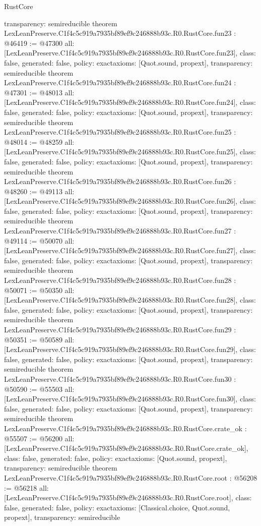 \begin{lexlean}{RustCore}
\begin{coremodule}
{  transparency: semireducible
}
theorem LexLeanPreserve.C1f4c5c919a7935bf89ef9c246888b93c.R0.RustCore.fun23 : @46419 := @47300 {
  all: [LexLeanPreserve.C1f4c5c919a7935bf89ef9c246888b93c.R0.RustCore.fun23],
  class: false,
  generated: false,
  policy: exact{axioms: [Quot.sound, propext]},
  transparency: semireducible
}
theorem LexLeanPreserve.C1f4c5c919a7935bf89ef9c246888b93c.R0.RustCore.fun24 : @47301 := @48013 {
  all: [LexLeanPreserve.C1f4c5c919a7935bf89ef9c246888b93c.R0.RustCore.fun24],
  class: false,
  generated: false,
  policy: exact{axioms: [Quot.sound, propext]},
  transparency: semireducible
}
theorem LexLeanPreserve.C1f4c5c919a7935bf89ef9c246888b93c.R0.RustCore.fun25 : @48014 := @48259 {
  all: [LexLeanPreserve.C1f4c5c919a7935bf89ef9c246888b93c.R0.RustCore.fun25],
  class: false,
  generated: false,
  policy: exact{axioms: [Quot.sound, propext]},
  transparency: semireducible
}
theorem LexLeanPreserve.C1f4c5c919a7935bf89ef9c246888b93c.R0.RustCore.fun26 : @48260 := @49113 {
  all: [LexLeanPreserve.C1f4c5c919a7935bf89ef9c246888b93c.R0.RustCore.fun26],
  class: false,
  generated: false,
  policy: exact{axioms: [Quot.sound, propext]},
  transparency: semireducible
}
theorem LexLeanPreserve.C1f4c5c919a7935bf89ef9c246888b93c.R0.RustCore.fun27 : @49114 := @50070 {
  all: [LexLeanPreserve.C1f4c5c919a7935bf89ef9c246888b93c.R0.RustCore.fun27],
  class: false,
  generated: false,
  policy: exact{axioms: [Quot.sound, propext]},
  transparency: semireducible
}
theorem LexLeanPreserve.C1f4c5c919a7935bf89ef9c246888b93c.R0.RustCore.fun28 : @50071 := @50350 {
  all: [LexLeanPreserve.C1f4c5c919a7935bf89ef9c246888b93c.R0.RustCore.fun28],
  class: false,
  generated: false,
  policy: exact{axioms: [Quot.sound, propext]},
  transparency: semireducible
}
theorem LexLeanPreserve.C1f4c5c919a7935bf89ef9c246888b93c.R0.RustCore.fun29 : @50351 := @50589 {
  all: [LexLeanPreserve.C1f4c5c919a7935bf89ef9c246888b93c.R0.RustCore.fun29],
  class: false,
  generated: false,
  policy: exact{axioms: [Quot.sound, propext]},
  transparency: semireducible
}
theorem LexLeanPreserve.C1f4c5c919a7935bf89ef9c246888b93c.R0.RustCore.fun30 : @50590 := @55503 {
  all: [LexLeanPreserve.C1f4c5c919a7935bf89ef9c246888b93c.R0.RustCore.fun30],
  class: false,
  generated: false,
  policy: exact{axioms: [Quot.sound, propext]},
  transparency: semireducible
}
theorem LexLeanPreserve.C1f4c5c919a7935bf89ef9c246888b93c.R0.RustCore.crate_ok : @55507 := @56200 {
  all: [LexLeanPreserve.C1f4c5c919a7935bf89ef9c246888b93c.R0.RustCore.crate_ok],
  class: false,
  generated: false,
  policy: exact{axioms: [Quot.sound, propext]},
  transparency: semireducible
}
theorem LexLeanPreserve.C1f4c5c919a7935bf89ef9c246888b93c.R0.RustCore.root : @56208 := @56218 {
  all: [LexLeanPreserve.C1f4c5c919a7935bf89ef9c246888b93c.R0.RustCore.root],
  class: false,
  generated: false,
  policy: exact{axioms: [Classical.choice, Quot.sound, propext]},
  transparency: semireducible
}


\end{coremodule}
\end{lexlean}
